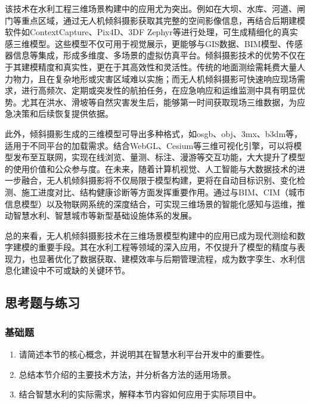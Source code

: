 该技术在水利工程三维场景构建中的应用尤为突出。例如在大坝、水库、河道、闸门等重点区域，通过无人机倾斜摄影获取其完整的空间影像信息，再结合后期建模软件如ContextCapture、Pix4D、3DF Zephyr等进行处理，可生成精细化的真实感三维模型。这些模型不仅可用于视觉展示，更能够与GIS数据、BIM模型、传感器信息等集成，形成多维度、多场景的虚拟仿真平台。倾斜摄影技术的优势不仅在于其建模精度和真实性，更在于其高效性和灵活性。传统的地面测绘需耗费大量人力物力，且在复杂地形或灾害区域难以实施；而无人机倾斜摄影可快速响应现场需求，进行高频次、定期或突发性的航拍任务，在应急响应和运维监测中具有明显优势。尤其在洪水、滑坡等自然灾害发生后，能够第一时间获取现场三维数据，为应急决策和后续恢复提供依据。

此外，倾斜摄影生成的三维模型可导出多种格式，如osgb、obj、3mx、b3dm等，适用于不同平台的加载需求。结合WebGL、Cesium等三维可视化引擎，可以将模型发布至互联网，实现在线浏览、量测、标注、漫游等交互功能，大大提升了模型的使用价值和公众参与度。在未来，随着计算机视觉、人工智能与大数据技术的进一步融合，无人机倾斜摄影将不仅局限于模型构建，更将在自动目标识别、变化检测、施工进度对比、结构健康诊断等方面发挥重要作用。通过与BIM、CIM（城市信息模型）以及物联网系统的深度结合，可实现三维场景的智能化感知与运维，推动智慧水利、智慧城市等新型基础设施体系的发展。

总的来看，无人机倾斜摄影技术在三维场景模型构建中的应用已成为现代测绘和数字建模的重要手段。其在水利工程等领域的深入应用，不仅提升了模型的精度与表现力，也显著优化了数据获取、建模效率与后期管理流程，成为数字孪生、水利信息化建设中不可或缺的关键环节。

\subsection{思考题与练习}\label{ux601dux8003ux9898ux4e0eux7ec3ux4e60-5}

\subsubsection{基础题}\label{ux57faux7840ux9898-5}

\begin{enumerate}
\def\labelenumi{\arabic{enumi}.}
\tightlist
\item
  请简述本节的核心概念，并说明其在智慧水利平台开发中的重要性。
\item
  总结本节介绍的主要技术方法，并分析各方法的适用场景。
\item
  结合智慧水利的实际需求，解释本节内容如何应用于实际项目中。
\end{enumerate}

